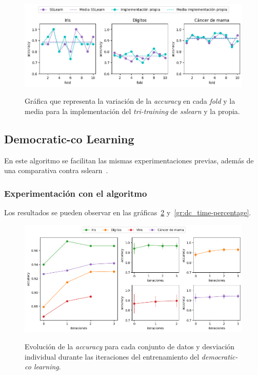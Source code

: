 \begin{figure}[h]
	\caption[\textit{Tri-training}: comparativa contra \textit{sslearn}]{Gráfica que representa la variación de la \textit{accuracy} en cada \textit{fold} y la media para la implementación del \textit{tri-training} de \textit{sslearn} y la propia.}
	\centering
	\includegraphics[scale=0.62]{../img/memoria/5_tritraining_sslearn}
	\label{gr:tt_vs_sslearn}
\end{figure}


\subsection{Democratic-co Learning}

En este algoritmo se facilitan las mismas experimentaciones previas, además de una comparativa contra sslearn~\cite{sslearnRepo}.

\subsubsection{Experimentación con el algoritmo}
Los resultados se pueden observar en las gráficas~\ref{gr:dc_train-iterations} y~\ref{gr:dc_time-percentage}.

\begin{figure}[h]
	\caption[\textit{Democratic-co}: resultados experimentación (iteraciones-entrenamiento)]{Evolución de la \textit{accuracy} para cada conjunto de datos y desviación individual durante las iteraciones del entrenamiento del \textit{democratic-co learning}.}
	\centering
	\includegraphics[scale=0.5]{../img/memoria/5_tritraining_score-iteraciones}
	\label{gr:dc_train-iterations}
\end{figure}

